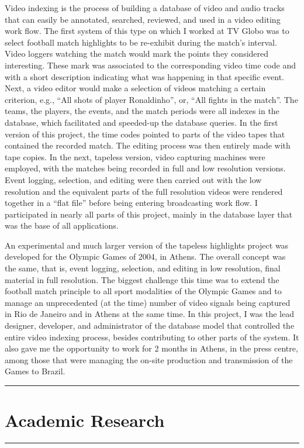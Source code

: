 \documentclass[a4paper]{article}
\begin{document}
Video indexing is the process of building a database of video and audio tracks that can easily be annotated, searched, reviewed, and used in a video editing work flow. The first system of this type on which I worked at TV Globo was to select football match highlights to be re-exhibit during the match's interval. Video loggers watching the match would mark the points they considered interesting. These mark was associated to the corresponding video time code and with a short description indicating what was happening in that specific event. Next, a video editor would make a selection of videos matching a certain criterion, e.g., ``All shots of player Ronaldinho'', or, ``All fights in the match''. The teams, the players, the events, and the match periods were all indexes in the database, which facilitated and speeded-up the database queries. In the first version of this project, the time codes pointed to parts of the video tapes that contained the recorded match. The editing process was then entirely made with tape copies. In the next, tapeless version, video capturing machines were employed, with the matches being recorded in full and low resolution versions. Event logging, selection, and editing were then carried out with the low resolution and the equivalent parts of the full resolution videos were rendered together in a ``flat file'' before being entering broadcasting work flow. I participated in nearly all parts of this project, mainly in the database layer that was the base of all applications. 

An experimental and much larger version of the tapeless highlights project was developed for the Olympic Games of 2004, in Athens. The overall concept was the same, that is, event logging, selection, and editing in low resolution, final material in full resolution. The biggest challenge this time was to extend the football match principle to all sport modalities of the Olympic Games and to manage an unprecedented (at the time) number of video signals being captured in Rio de Janeiro and in Athens at the same time. In this project, I was the lead designer, developer, and administrator of the database model that controlled the entire video indexing process, besides contributing to other parts of the system. It also gave me the opportunity to work for 2 months in Athens, in the press centre, among those that were managing the on-site production and transmission of the Games to Brazil.

\medskip
\medskip
\hrule
\section{Academic Research}
\hrule
\medskip
\medskip
\end{document}
